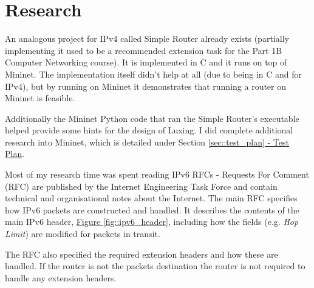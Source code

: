 \documentclass[12pt,a4paper,twoside,openany]{report}
\begin{document}
\section{Research}
An analogous project for IPv4 called Simple Router already exists\cite{simple_router} (partially implementing it used to be a recommended extension task for the Part 1B Computer Networking course).  It is implemented in C and it runs on top of Mininet.  The implementation itself didn't help at all (due to being in C and for IPv4), but by running on Mininet it demonstrates that running a router on Mininet is feasible.  

Additionally the Mininet Python code that ran the Simple Router's executable helped provide some hints for the design of Luxing.  I did complete additional research into Mininet, which is detailed under Section \ref{sec::test_plan}\hyperref[sec::test_plan]{ - Test Plan}.

\bigskip

Most of my research time was spent reading IPv6 RFCs - Requests For Comment (RFC) are published by the Internet Engineering Task Force and contain technical and organisational notes about the Internet\cite{what_rfc}.  The main RFC\cite{ipv6_rfc} specifies how IPv6 packets are constructed and handled. It describes the contents of the main IPv6 header, \hyperref[fig::ipv6_header]{Figure }\ref{fig::ipv6_header}, including how the fields (e.g. \textit{Hop Limit}) are modified for packets in transit. 

The RFC also specified the required extension headers and how these are handled. If the router is not the packets destination the router is not required to handle any extension headers.
\end{document}
